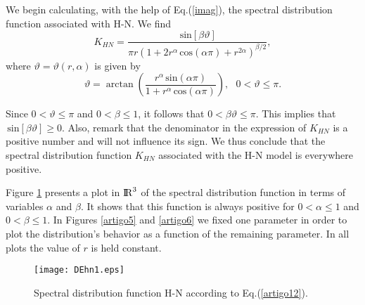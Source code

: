 \documentclass[12pt]{amsart}
\numberwithin{equation}{section}
\newcommand{\real}{{\rm I\!R}}
\renewcommand{\sin}{\hspace{2pt}\textrm{sin}}
\renewcommand{\cos}{\hspace{2pt}\textrm{cos}}
\begin{document}
\begin{itemize}

We begin calculating, with the help of Eq.(\ref{imag}), the spectral
distribution function associated with H-N. We find 
\begin{equation}
K_{HN}=\frac{\sin \left[\beta\vartheta\right]}{\pi r (1+2r^\alpha\cos(\alpha
	\pi)+r^{2\alpha})^{\beta/2}},
\label{artigo12}
\end{equation}
where $\vartheta=\vartheta(r,\alpha)$ is given by 
\begin{equation}
\vartheta=\arctan \left(\frac{r^\alpha \sin(\alpha \pi)}{1+r^{\alpha}\cos(\alpha\pi)}\right),\,\,\,\,0<\vartheta\leq \pi.
\end{equation}

Since $0<\vartheta\leq \pi$ and $0<\beta\leq1$, it follows that $0<\beta
\vartheta\leq\pi$. This implies that 
$\sin [\beta\vartheta]\geq 0$. Also, remark that the denominator in the
expression of $K_{HN}$ is a positive number and will not influence its sign. 
We thus conclude that the spectral distribution function $K_{HN}$
associated with the H-N model is everywhere positive. 

Figure \ref{artigo4} presents a plot in $\real^3$ of the spectral
distribution function in terms of variables $\alpha$ and $\beta$. It shows 
that this function is always positive for $0<\alpha\leq1$ and
$0<\beta\leq1$. In Figures \ref{artigo5} and \ref{artigo6} we fixed one
parameter in order to plot the distribution's behavior as a function of the
remaining parameter. In all plots the value of $r$ is held constant. 

\end{itemize}
\begin{figure}[H]
\begin{center}
\texttt{[image: DEhn1.eps]}
\end{center}
\caption{Spectral distribution function H-N according to Eq.(\ref{artigo12}).}
\label{artigo4}
\end{figure}
\end{document}
